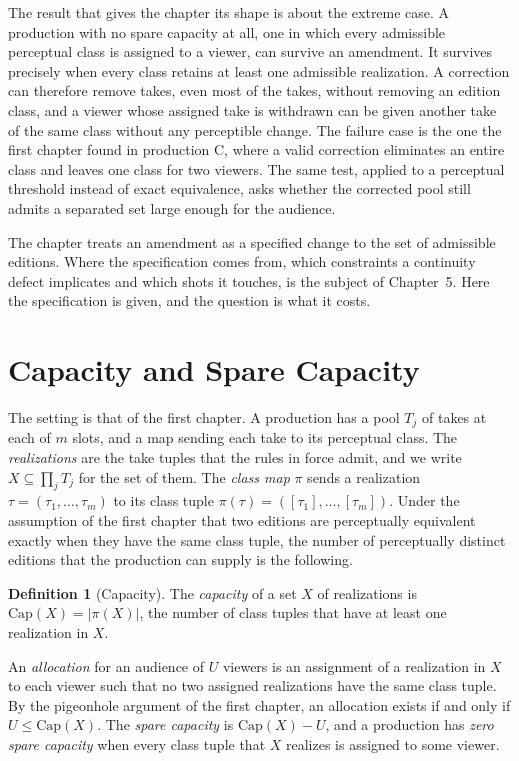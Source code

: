 \documentclass[11pt,twoside,openright]{book}
\theoremstyle{plain}
\theoremstyle{definition}
\newtheorem{definition}[theorem]{Definition}
\theoremstyle{remark}
\newcommand{\Capac}{\mathrm{Cap}}
\begin{document}
The result that gives the chapter its shape is about the extreme case. A production with no spare capacity at all, one in which every admissible perceptual class is assigned to a viewer, can survive an amendment. It survives precisely when every class retains at least one admissible realization. A correction can therefore remove takes, even most of the takes, without removing an edition class, and a viewer whose assigned take is withdrawn can be given another take of the same class without any perceptible change. The failure case is the one the first chapter found in production C, where a valid correction eliminates an entire class and leaves one class for two viewers. The same test, applied to a perceptual threshold instead of exact equivalence, asks whether the corrected pool still admits a separated set large enough for the audience.

The chapter treats an amendment as a specified change to the set of admissible editions. Where the specification comes from, which constraints a continuity defect implicates and which shots it touches, is the subject of Chapter~5. Here the specification is given, and the question is what it costs.

\section{Capacity and Spare Capacity}\label{sec:cap}

The setting is that of the first chapter. A production has a pool $T_j$ of takes at each of $m$ slots, and a map sending each take to its perceptual class. The \emph{realizations} are the take tuples that the rules in force admit, and we write $X\subseteq\prod_jT_j$ for the set of them. The \emph{class map} $\pi$ sends a realization $\tau=(\tau_1,\dots,\tau_m)$ to its class tuple $\pi(\tau)=([\tau_1],\dots,[\tau_m])$. Under the assumption of the first chapter that two editions are perceptually equivalent exactly when they have the same class tuple, the number of perceptually distinct editions that the production can supply is the following.

\begin{definition}[Capacity]\label{def:capacity}
The \emph{capacity} of a set $X$ of realizations is $\Capac(X)=\lvert\pi(X)\rvert$, the number of class tuples that have at least one realization in $X$.
\end{definition}

An \emph{allocation} for an audience of $U$ viewers is an assignment of a realization in $X$ to each viewer such that no two assigned realizations have the same class tuple. By the pigeonhole argument of the first chapter, an allocation exists if and only if $U\le\Capac(X)$. The \emph{spare capacity} is $\Capac(X)-U$, and a production has \emph{zero spare capacity} when every class tuple that $X$ realizes is assigned to some viewer.
\end{document}
